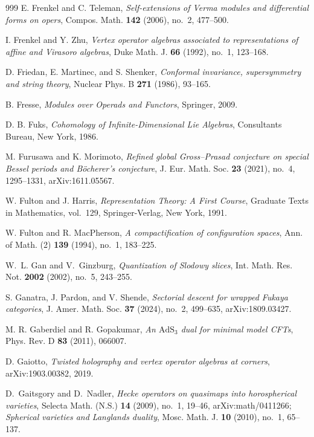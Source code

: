 \begin{thebibliography}{999}
E. Frenkel and C. Teleman, \emph{Self-extensions of Verma modules and differential forms on opers}, Compos. Math. \textbf{142} (2006), no.~2, 477--500.

I. Frenkel and Y. Zhu, \emph{Vertex operator algebras associated to representations of affine and Virasoro algebras}, Duke Math. J. \textbf{66} (1992), no.~1, 123--168.

D. Friedan, E. Martinec, and S. Shenker, \emph{Conformal invariance, supersymmetry and string theory}, Nuclear Phys. B \textbf{271} (1986), 93--165.

B. Fresse, \emph{Modules over Operads and Functors}, Springer, 2009.

D. B. Fuks, \emph{Cohomology of Infinite-Dimensional Lie Algebras}, Consultants Bureau, New York, 1986.

M. Furusawa and K. Morimoto, \emph{Refined global Gross--Prasad conjecture on special Bessel periods and B\"ocherer's conjecture}, J. Eur. Math. Soc. \textbf{23} (2021), no.~4, 1295--1331, arXiv:1611.05567.

W. Fulton and J. Harris, \emph{Representation Theory: A First Course}, Graduate Texts in Mathematics, vol.~129, Springer-Verlag, New York, 1991.

W. Fulton and R. MacPherson, \emph{A compactification of configuration spaces}, Ann. of Math. (2) \textbf{139} (1994), no.~1, 183--225.

W.~L. Gan and V.~Ginzburg, \emph{Quantization of Slodowy slices}, Int. Math. Res. Not. \textbf{2002} (2002), no.~5, 243--255.

S. Ganatra, J. Pardon, and V. Shende, \emph{Sectorial descent for wrapped {F}ukaya categories}, J. Amer. Math. Soc. \textbf{37} (2024), no.~2, 499--635, arXiv:1809.03427.

M. R. Gaberdiel and R. Gopakumar, \emph{An $\mathrm{AdS}_3$ dual for minimal model CFTs}, Phys. Rev. D \textbf{83} (2011), 066007.

D. Gaiotto, \emph{Twisted holography and vertex operator algebras at corners}, arXiv:1903.00382, 2019.

D.~Gaitsgory and D.~Nadler, \emph{Hecke operators on quasimaps into horospherical varieties}, Selecta Math. (N.S.) \textbf{14} (2009), no.~1, 19--46, arXiv:math/0411266; \emph{Spherical varieties and Langlands duality}, Mosc. Math. J. \textbf{10} (2010), no.~1, 65--137.


\end{thebibliography}
